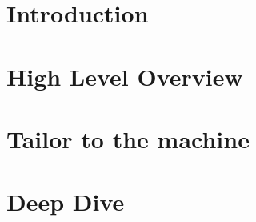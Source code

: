 \documentclass{book}
\begin{document}
\maketitle



\tableofcontents

\part{Introduction}
\label{part:introduction}










\part{High Level Overview}
\label{part:high-level}




















\part{Tailor to the machine}
\label{part:tailor}








\part{Deep Dive}
\label{part:performance-assessment}








%
%
%
 
\end{document}
